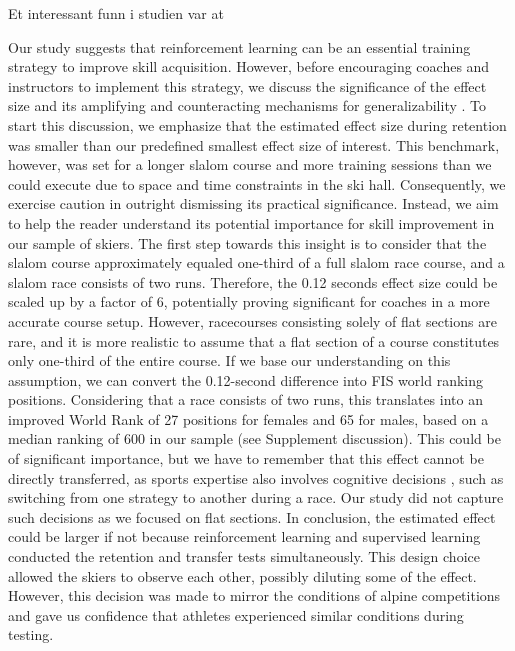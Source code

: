 \documentclass{article}
\begin{document}
Et interessant funn i studien var at 


Our study suggests that reinforcement learning can be an essential training strategy to improve skill acquisition. However, before encouraging coaches and instructors to implement this strategy, we discuss the significance of the effect size and its amplifying and counteracting mechanisms for generalizability \cite{anvari_not_2023}. To start this discussion, we emphasize that the estimated effect size during retention was smaller than our predefined smallest effect size of interest. This benchmark, however, was set for a longer slalom course and more training sessions than we could execute due to space and time constraints in the ski hall. Consequently, we exercise caution in outright dismissing its practical significance. Instead, we aim to help the reader understand its potential importance for skill improvement in our sample of skiers. The first step towards this insight is to consider that the slalom course approximately equaled one-third of a full slalom race course, and a slalom race consists of two runs. Therefore, the 0.12 seconds effect size could be scaled up by a factor of 6, potentially proving significant for coaches in a more accurate course setup. However, racecourses consisting solely of flat sections are rare, and it is more realistic to assume that a flat section of a course constitutes only one-third of the entire course. If we base our understanding on this assumption, we can convert the 0.12-second difference into FIS world ranking positions. Considering that a race consists of two runs, this translates into an improved World Rank of 27 positions for females and 65 for males, based on a median ranking of 600 in our sample (see Supplement discussion). This could be of significant importance, but we have to remember that this effect cannot be directly transferred, as sports expertise also involves cognitive decisions \cite{mangalam_investigating_2023, krakauer_motor_2019}, such as switching from one strategy to another during a race. Our study did not capture such decisions as we focused on flat sections. In conclusion, the estimated effect could be larger if not because reinforcement learning and supervised learning conducted the retention and transfer tests simultaneously. This design choice allowed the skiers to observe each other, possibly diluting some of the effect. However, this decision was made to mirror the conditions of alpine competitions and gave us confidence that athletes experienced similar conditions during testing. 
\end{document}
